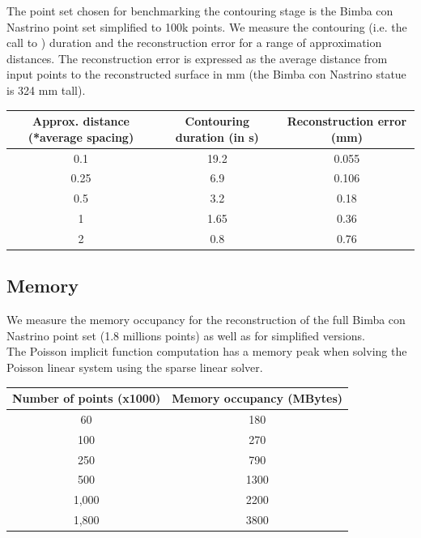 The point set chosen for benchmarking the contouring stage is the Bimba con Nastrino point set simplified to 100k points. We measure the contouring (i.e. the call to ) duration and the reconstruction error for a range of approximation distances.
The reconstruction error is expressed as the average distance from input points to the reconstructed surface in mm (the Bimba con Nastrino statue is 324 mm tall).

\begin{tabular}{|c|c|c|}
  \hline
  Approx. distance (*average spacing)    & Contouring duration (in s) & Reconstruction error (mm) \\
  \hline
  0.1                                    & 19.2                       & 0.055 \\
  0.25                                   & 6.9                        & 0.106 \\
  0.5                                    & 3.2                        & 0.18 \\
  1                                      & 1.65                        & 0.36 \\
  2                                      & 0.8                         & 0.76 \\
  \hline
\end{tabular}



\subsection{Memory}

We measure the memory occupancy for the reconstruction of the full Bimba con Nastrino point set (1.8 millions points) as well as for simplified versions.\\
The Poisson implicit function computation has a memory peak when solving the Poisson linear system using the sparse linear solver.  \\

\begin{tabular}{|c|c|}
  \hline
  Number of points (x1000) & Memory occupancy (MBytes) \\
  \hline
  60                         & 180 \\
  100                        & 270 \\
  250                        & 790 \\
  500                        & 1300 \\
  1,000                       & 2200 \\
  1,800                       & 3800 \\
  \hline
\end{tabular}



